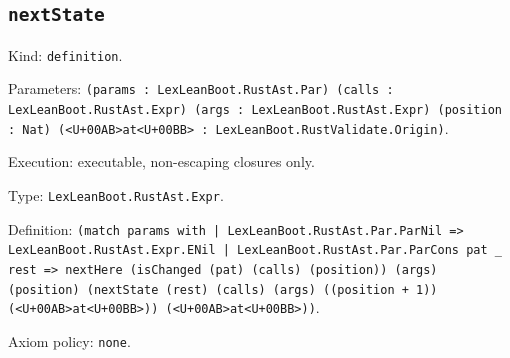 \documentclass[11pt]{article}
\begin{document}
\subsection*{\texttt{nextState}}
\noindent Kind: \texttt{definition}.\par
\noindent Parameters: \texttt{(params : LexLeanBoot.RustAst.Par) (calls : LexLeanBoot.RustAst.Expr) (args : LexLeanBoot.RustAst.Expr) (position : Nat) (<U+00AB>at<U+00BB> : LexLeanBoot.RustValidate.Origin)}.\par
\noindent Execution: executable, non-escaping closures only.\par
\noindent Type: \texttt{LexLeanBoot.RustAst.Expr}.\par
\noindent Definition: \texttt{(match params with | LexLeanBoot.RustAst.Par.ParNil => LexLeanBoot.RustAst.Expr.ENil | LexLeanBoot.RustAst.Par.ParCons pat \_ rest => nextHere (isChanged (pat) (calls) (position)) (args) (position) (nextState (rest) (calls) (args) ((position + 1)) (<U+00AB>at<U+00BB>)) (<U+00AB>at<U+00BB>))}.\par
\noindent Axiom policy: \texttt{none}.\par
\end{document}
